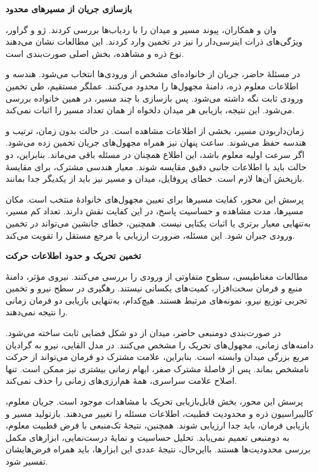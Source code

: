 \textbf{بازسازی جریان از مسیرهای محدود}

وان و همکاران، پیوند مسیر و میدان را با ردیاب‌ها بررسی کردند.
ژو و گراور، ویژگی‌های ذرات اینرسی‌دار را نیز در تخمین وارد کردند.
این مطالعات نشان می‌دهند نوع ذره و مشاهده، بخش اصلی صورت‌بندی است.
\cite{Wan2026TrajectoryFlowNet,ZhouGrauer2026Joint}

در مسئلهٔ حاضر، جریان از خانواده‌ای مشخص از ورودی‌ها انتخاب می‌شود.
هندسه و اطلاعات معلوم ذره، دامنهٔ مجهول‌ها را محدود می‌کنند.
عملگر مستقیم، طی تخمین ورودی ثابت نگه داشته می‌شود.
پس بازسازی با چند مسیر، در همین خانواده بررسی می‌شود.
این نتیجه، بازیابی هر میدان دلخواه از همان تعداد مسیر را اثبات نمی‌کند.

زمان‌داربودن مسیر، بخشی از اطلاعات مشاهده است.
در حالت بدون زمان، ترتیب و هندسه حفظ می‌شوند.
ساعت پنهان نیز همراه مجهول‌های جریان تخمین زده می‌شود.
اگر سرعت اولیه معلوم باشد، این اطلاع همچنان در مسئله باقی می‌ماند.
بنابراین، دو حالت باید با اطلاعات جانبی دقیق مقایسه شوند.
معیار هندسی مشترک، برای مقایسهٔ بازپخش آن‌ها لازم است.
خطای پروفایل، میدان و مسیر نیز باید از یکدیگر جدا بمانند.

پرسش این محور، کفایت مسیرها برای تعیین مجهول‌های خانوادهٔ منتخب است.
مکان مسیرها، مدت مشاهده و حساسیت پاسخ، در این کفایت نقش دارند.
تعداد کم مسیر، به‌تنهایی معیار برتری یا اثبات یکتایی نیست.
همچنین، خطای جانشین می‌تواند در تخمین ورودی جبران شود.
این مسئله، ضرورت ارزیابی با مرجع مستقل را تقویت می‌کند.
\cite{Cao2023ResidualCorrection}

\textbf{تخمین تحریک و حدود اطلاعات حرکت}

مطالعات مغناطیسی، سطوح متفاوتی از ورودی را بررسی می‌کنند.
نیروی مؤثر، دامنهٔ منبع و فرمان سخت‌افزار، کمیت‌های یکسانی نیستند.
رهگیری در سطح نیرو و تخمین تجربی توزیع نیرو، نمونه‌های مرتبط هستند.
هیچ‌کدام، به‌تنهایی بازیابی دو فرمان زمانی را نتیجه نمی‌دهند.
\cite{ElHamdaoui2026Tracking,Strayer2024ForceMapping}

در صورت‌بندی دومنبعی حاضر، میدان از دو شکل فضایی ثابت ساخته می‌شود.
دامنه‌های زمانی، مجهول‌های تحریک را مشخص می‌کنند.
در مدل القایی، نیرو به گرادیان مربع بزرگی میدان وابسته است.
بنابراین، علامت مشترک دو فرمان می‌تواند از حرکت نامشخص بماند.
پس از فاصلهٔ مشترک صفر، ابهام زمانی بیشتری نیز ممکن است.
تنها اصلاح علامت سراسری، همهٔ هم‌ارزی‌های زمانی را حذف نمی‌کند.

پرسش این محور، بخش قابل‌بازیابی تحریک با مشاهدات موجود است.
جریان معلوم، کالیبراسیون ذره و محدودیت قطبیت، اطلاعات مسئله را تغییر می‌دهند.
بازتولید مسیر و بازیابی فرمان، باید جدا ارزیابی شوند.
همچنین، نتیجهٔ تک‌منبعی با فرض قطبیت معلوم، به دومنبعی تعمیم نمی‌یابد.
تحلیل حساسیت و نمایهٔ درست‌نمایی، ابزارهای مکمل بررسی محدودیت‌ها هستند.
بااین‌حال، نتیجهٔ عددی این ابزارها، باید همراه فرض‌هایشان تفسیر شود.
\cite{Raue2009ProfileLikelihood}

